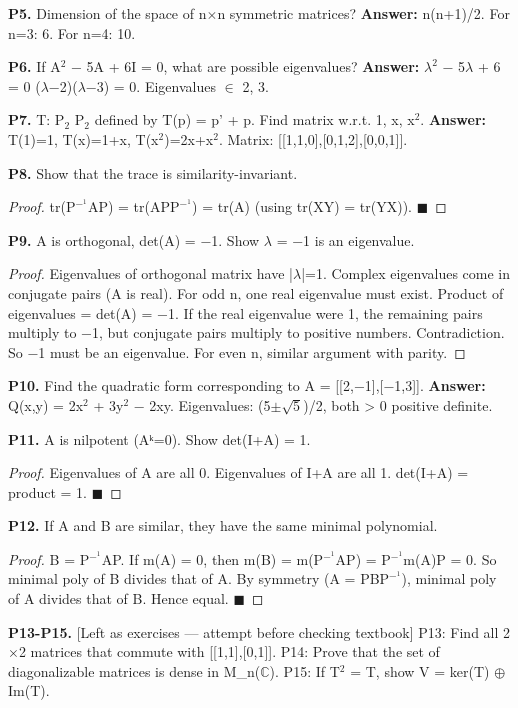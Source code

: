 \documentclass[12pt,a4paper,openany]{book}
\begin{document}
{{\textbf{P5.} Dimension of the space of n$\times$n symmetric matrices?
\textbf{Answer:} n(n+1)/2. For n=3: 6. For n=4: 10.

\textbf{P6.} If A$^2$ − 5A + 6I = 0, what are possible eigenvalues?
\textbf{Answer:} $\lambda^2$ − 5$\lambda$ + 6 = 0  ($\lambda$−2)($\lambda$−3) = 0. Eigenvalues $\in$ {2, 3}.

\textbf{P7.} T: P$_2$  P$_2$ defined by T(p) = p' + p. Find matrix w.r.t. {1, x, x$^2$}.
\textbf{Answer:} T(1)=1, T(x)=1+x, T(x$^2$)=2x+x$^2$. Matrix: [[1,1,0],[0,1,2],[0,0,1]].

\textbf{P8.} Show that the trace is similarity-invariant.
\begin{proof}
tr(P$^{-}^1$AP) = tr(APP$^{-}^1$) = tr(A) (using tr(XY) = tr(YX)). $\blacksquare$
\end{proof}

\textbf{P9.} A is orthogonal, det(A) = −1. Show $\lambda$ = −1 is an eigenvalue.
\begin{proof}
Eigenvalues of orthogonal matrix have |$\lambda$|=1. Complex eigenvalues come in conjugate pairs (A is real). For odd n, one real eigenvalue must exist. Product of eigenvalues = det(A) = −1. If the real eigenvalue were 1, the remaining pairs multiply to −1, but conjugate pairs multiply to positive numbers. Contradiction. So −1 must be an eigenvalue. For even n, similar argument with parity.
\end{proof}

\textbf{P10.} Find the quadratic form corresponding to A = [[2,−1],[−1,3]].
\textbf{Answer:} Q(x,y) = 2x$^2$ + 3y$^2$ − 2xy. Eigenvalues: (5$\pm$$\sqrt{5}$)/2, both > 0  positive definite.

\textbf{P11.} A is nilpotent (Aᵏ=0). Show det(I+A) = 1.
\begin{proof}
Eigenvalues of A are all 0. Eigenvalues of I+A are all 1. det(I+A) = product = 1. $\blacksquare$
\end{proof}

\textbf{P12.} If A and B are similar, they have the same minimal polynomial.
\begin{proof}
B = P$^{-}^1$AP. If m(A) = 0, then m(B) = m(P$^{-}^1$AP) = P$^{-}^1$m(A)P = 0. So minimal poly of B divides that of A. By symmetry (A = PBP$^{-}^1$), minimal poly of A divides that of B. Hence equal. $\blacksquare$
\end{proof}

\textbf{P13-P15.} [Left as exercises — attempt before checking textbook]
P13: Find all 2$\times$2 matrices that commute with [[1,1],[0,1]].
P14: Prove that the set of diagonalizable matrices is dense in M_n($\mathbb{C}$).
P15: If T$^2$ = T, show V = ker(T) $\oplus$ Im(T).

}}
\end{document}
